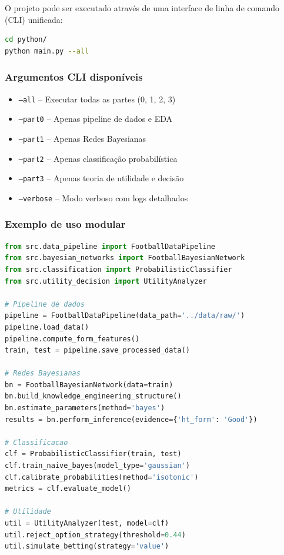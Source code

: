 \documentclass[12pt, a4paper]{article}
\begin{document}
O projeto pode ser executado através de uma interface de linha de comando (CLI) unificada:

\begin{lstlisting}[language=bash, caption={Executar todas as partes do projeto}]
cd python/
python main.py --all
\end{lstlisting}

\subsubsection{Argumentos CLI disponíveis}

\begin{itemize}
  \item \texttt{--all} -- Executar todas as partes (0, 1, 2, 3)
  \item \texttt{--part0} -- Apenas pipeline de dados e EDA
  \item \texttt{--part1} -- Apenas Redes Bayesianas
  \item \texttt{--part2} -- Apenas classificação probabilística
  \item \texttt{--part3} -- Apenas teoria de utilidade e decisão
  \item \texttt{--verbose} -- Modo verboso com logs detalhados
\end{itemize}

\subsubsection{Exemplo de uso modular}

\begin{lstlisting}[language=Python, caption={Importação e uso modular das classes}]
from src.data_pipeline import FootballDataPipeline
from src.bayesian_networks import FootballBayesianNetwork
from src.classification import ProbabilisticClassifier
from src.utility_decision import UtilityAnalyzer

# Pipeline de dados
pipeline = FootballDataPipeline(data_path='../data/raw/')
pipeline.load_data()
pipeline.compute_form_features()
train, test = pipeline.save_processed_data()

# Redes Bayesianas
bn = FootballBayesianNetwork(data=train)
bn.build_knowledge_engineering_structure()
bn.estimate_parameters(method='bayes')
results = bn.perform_inference(evidence={'ht_form': 'Good'})

# Classificacao
clf = ProbabilisticClassifier(train, test)
clf.train_naive_bayes(model_type='gaussian')
clf.calibrate_probabilities(method='isotonic')
metrics = clf.evaluate_model()

# Utilidade
util = UtilityAnalyzer(test, model=clf)
util.reject_option_strategy(threshold=0.44)
util.simulate_betting(strategy='value')
\end{lstlisting}
\end{document}
